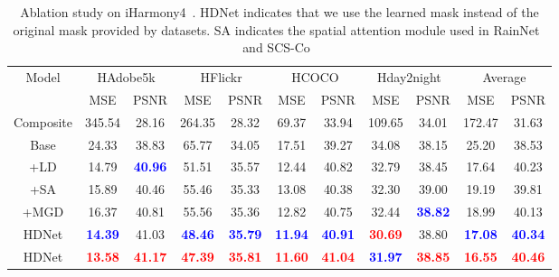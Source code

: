 \documentclass[sigconf]{acmart}
\begin{document}
\begin{table*}[t]
	\centering
	\begin{tabular}{ccccccccccc}
		\toprule
		\multirow{2}{*}{Model} & \multicolumn{2}{c}{HAdobe5k} & \multicolumn{2}{c}{HFlickr} & \multicolumn{2}{c}{HCOCO} & \multicolumn{2}{c}{Hday2night}& \multicolumn{2}{c}{Average} \\ \cline{2-3} \cline{4-11}&MSE&PSNR&MSE&PSNR&MSE&PSNR&MSE&PSNR&MSE&PSNR\\
		\midrule
		Composite&345.54&28.16&264.35&28.32&69.37&33.94&109.65&34.01&172.47&31.63\\
		Base
		& 24.33 &38.83 & 65.77 & 34.05 & 17.51 & 39.27 &34.08 & 38.15&25.20&38.53\\
		+LD& 14.79& \textbf{\textcolor{blue}{40.96}}& 51.51 & 35.57 & 12.44 & 40.82 & 32.79 & 38.45 & 17.64&40.23 \\
		+SA& 15.89 & 40.46 & 55.46 & 35.33 & 13.08 & 40.38 & 32.30 & 39.00 & 19.19&39.81 \\
		+MGD&16.37 &40.81 &55.56 &35.36 &12.82 & 40.75 & 32.44& \textbf{\textcolor{blue}{38.82}}&18.99&40.13 \\ 
		HDNet& \textbf{\textcolor{blue}{14.39}}&41.03 &\textbf{\textcolor{blue}{48.46}} &\textbf{\textcolor{blue}{35.79}} & \textbf{\textcolor{blue}{11.94}}&\textbf{\textcolor{blue}{40.91}} &\textbf{\textcolor{red}{30.69}}&38.80 & \textbf{\textcolor{blue}{17.08}}&\textbf{\textcolor{blue}{40.34}} \\
		
		\midrule
		HDNet&\textbf{\textcolor{red}{13.58}}&\textbf{\textcolor{red}{41.17}} & \textbf{\textcolor{red}{47.39}} & \textbf{\textcolor{red}{35.81}} & 
		\textbf{\textcolor{red}{11.60}} & \textbf{\textcolor{red}{41.04}} & \textbf{\textcolor{blue}{31.97}}& \textbf{\textcolor{red}{38.85}}& \textbf{\textcolor{red}{16.55}} & \textbf{\textcolor{red}{40.46}} \\
		\bottomrule
	\end{tabular}
	\caption{Ablation study on iHarmony4~\cite{DoveNet}. HDNet indicates that we use the learned mask instead of the original mask provided by datasets. SA indicates the spatial attention module used in RainNet~\cite{RAIN} and SCS-Co~\cite{hang2022scs}}
\end{table*}
\end{document}
